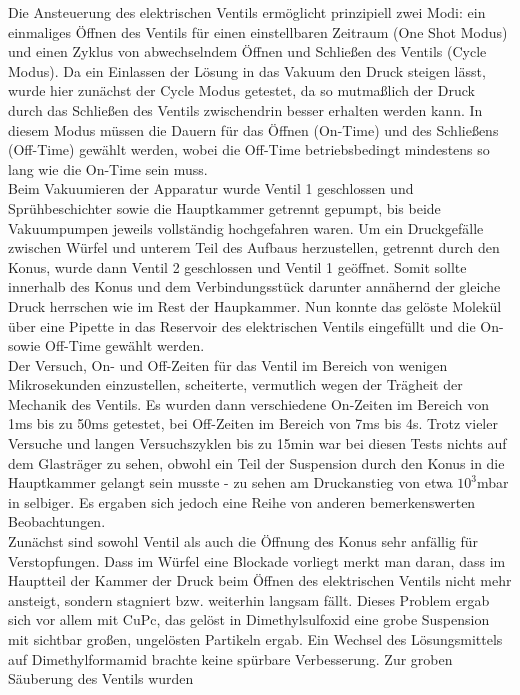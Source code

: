Die Ansteuerung des elektrischen Ventils ermöglicht
prinzipiell zwei Modi: ein einmaliges Öffnen des
Ventils für einen einstellbaren Zeitraum (One
Shot Modus) und einen Zyklus von abwechselndem
Öffnen und Schließen des Ventils (Cycle Modus).
Da ein Einlassen der Lösung in das Vakuum
den Druck steigen lässt, wurde hier
zunächst der Cycle Modus getestet, da so
mutmaßlich der Druck durch das Schließen des
Ventils zwischendrin besser erhalten werden
kann. In diesem Modus müssen die Dauern für das
Öffnen (On-Time) und des Schließens (Off-Time)
gewählt werden, wobei die Off-Time
betriebsbedingt mindestens so lang wie die
On-Time sein muss.\\
Beim Vakuumieren der Apparatur wurde Ventil 1
 geschlossen und Sprühbeschichter sowie die 
 Hauptkammer getrennt gepumpt, bis beide
 Vakuumpumpen jeweils vollständig hochgefahren
 waren.
 Um ein Druckgefälle zwischen Würfel und unterem
 Teil des Aufbaus herzustellen, getrennt durch den
 Konus, wurde dann Ventil 2 geschlossen und
 Ventil 1 geöffnet.
 Somit sollte innerhalb des Konus und dem
 Verbindungsstück darunter annähernd der gleiche
 Druck herrschen wie im Rest der Haupkammer.
 Nun konnte das gelöste Molekül über eine Pipette
 in das Reservoir des elektrischen Ventils
 eingefüllt und die On- sowie Off-Time gewählt
 werden.\\
 Der Versuch, On- und Off-Zeiten für das Ventil im
Bereich von wenigen Mikrosekunden einzustellen,
scheiterte, vermutlich wegen der Trägheit der Mechanik des
Ventils. Es wurden dann verschiedene On-Zeiten im Bereich von 1ms bis zu 50ms getestet, bei
Off-Zeiten im Bereich von 7ms bis 4s. Trotz vieler Versuche und langen Versuchszyklen bis zu 15min
war bei diesen Tests nichts auf dem Glasträger zu sehen, obwohl ein Teil der Suspension durch den
Konus in die Hauptkammer gelangt sein musste - zu sehen am Druckanstieg von etwa $10^{3}$mbar in
selbiger. Es ergaben sich jedoch eine Reihe von anderen bemerkenswerten Beobachtungen.\\
Zunächst sind sowohl Ventil als auch die Öffnung des Konus sehr anfällig für Verstopfungen. Dass im
Würfel eine Blockade vorliegt merkt man daran, dass im Hauptteil der Kammer der
Druck beim Öffnen des elektrischen Ventils nicht mehr ansteigt, sondern stagniert bzw. weiterhin
langsam fällt. Dieses Problem ergab sich vor allem mit CuPc, das gelöst in Dimethylsulfoxid eine
grobe Suspension mit sichtbar großen, ungelösten Partikeln ergab. Ein Wechsel des Lösungsmittels auf
Dimethylformamid brachte keine spürbare Verbesserung. Zur groben Säuberung des Ventils wurden

